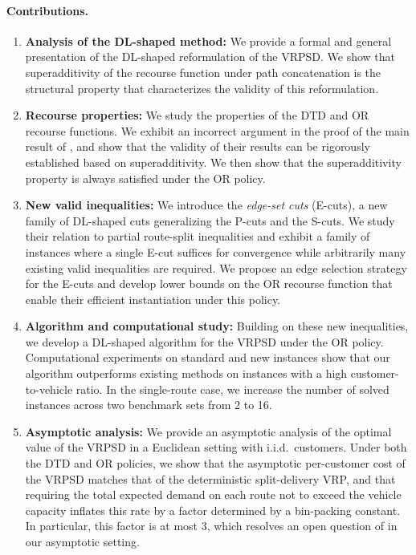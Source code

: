 \documentclass{article}
\newcommand{\rev}[1]{{\color{black}#1}}
\begin{document}
\paragraph{Contributions.}
\begin{enumerate}
    \item \textbf{Analysis of the DL-shaped method:} We provide a formal and general presentation of the DL-shaped reformulation of the VRPSD. We show that superadditivity of the recourse function under path concatenation is the structural property that characterizes the validity of this reformulation.
    \item \textbf{Recourse properties:} We study the properties of the DTD and OR recourse functions. We exhibit an incorrect argument in the proof of the main result of \cite{parada2024disaggregated}, and show that the validity of their results can be rigorously established based on superadditivity. We then show that the superadditivity property is always satisfied under the OR policy.
    \item \textbf{New valid inequalities:} We introduce the \textit{edge-set cuts} (E-cuts), a new family of DL-shaped cuts generalizing the P-cuts and the S-cuts. \rev{We study their relation to partial route-split inequalities and exhibit a family of instances where a single E-cut suffices for convergence while arbitrarily many existing valid inequalities are required. We propose an edge selection strategy for the E-cuts and develop lower bounds on the OR recourse function that enable their efficient instantiation under this policy.}
    \item \textbf{Algorithm and computational study:} Building on these new inequalities, we develop a DL-shaped algorithm for the VRPSD under the OR policy. Computational experiments on standard and new instances show that our algorithm outperforms existing methods \rev{on instances with a high customer-to-vehicle ratio}. In the single-route case, we increase the number of solved instances across two benchmark sets from 2 to 16.
    \item \rev{\textbf{Asymptotic analysis:} We provide an asymptotic analysis of the optimal value of the VRPSD in a Euclidean setting with i.i.d.\ customers. Under both the DTD and OR policies, we show that the asymptotic per-customer cost of the VRPSD matches that of the deterministic split-delivery VRP, and that requiring the total expected demand on each route not to exceed the vehicle capacity inflates this rate by a factor determined by a bin-packing constant. In particular, this factor is at most 3, which resolves an open question of \cite{hoogendoorn2025evaluation} in our asymptotic setting.}
\end{enumerate}
\end{document}

